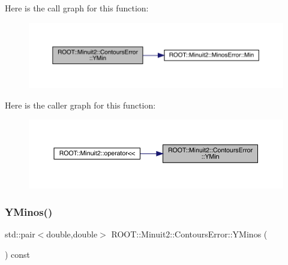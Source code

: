 Here is the call graph for this function\+:
\nopagebreak
\begin{figure}[H]
\begin{center}
\leavevmode
\includegraphics[width=350pt]{d3/de9/classROOT_1_1Minuit2_1_1ContoursError_ac2bd4c328fe62d04b2809d9e0730efe3_cgraph}
\end{center}
\end{figure}
Here is the caller graph for this function\+:\nopagebreak
\begin{figure}[H]
\begin{center}
\leavevmode
\includegraphics[width=350pt]{d3/de9/classROOT_1_1Minuit2_1_1ContoursError_ac2bd4c328fe62d04b2809d9e0730efe3_icgraph}
\end{center}
\end{figure}
\mbox{\label{classROOT_1_1Minuit2_1_1ContoursError_a181d8326a32d95dd0f619bcb63076c00}} 
\subsubsection{\texorpdfstring{YMinos()}{YMinos()}\hspace{0.1cm}{\footnotesize\ttfamily [1/2]}}
{\footnotesize\ttfamily std\+::pair$<$double,double$>$ R\+O\+O\+T\+::\+Minuit2\+::\+Contours\+Error\+::\+Y\+Minos (\begin{DoxyParamCaption}{ }\end{DoxyParamCaption}) const\hspace{0.3cm}{\ttfamily [inline]}}

\mbox{\label{classROOT_1_1Minuit2_1_1ContoursError_a181d8326a32d95dd0f619bcb63076c00}} 
